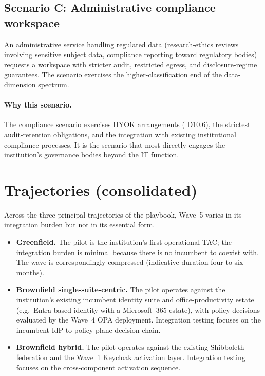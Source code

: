 \subsection{Scenario C: Administrative compliance workspace}
\label{sec:w5-scenario-compliance}

An administrative service handling regulated data (research-ethics
reviews involving sensitive subject data, compliance reporting
toward regulatory bodies) requests a workspace with stricter
audit, restricted egress, and disclosure-regime guarantees. The
scenario exercises the higher-classification end of the
data-dimension spectrum.

\paragraph{Why this scenario.} The compliance scenario exercises
HYOK arrangements ( D10.6), the strictest
audit-retention obligations, and the integration with existing
institutional compliance processes. It is the scenario that most
directly engages the institution's governance bodies beyond the IT
function.

\section{Trajectories (consolidated)}
\label{sec:w5-trajectories}

Across the three principal trajectories of the playbook, Wave~5
varies in its integration burden but not in its essential form.

\begin{itemize}[leftmargin=1.5em,nosep]
  \item \textbf{Greenfield.} The pilot is the institution's first
    operational TAC; the integration burden is minimal because
    there is no incumbent to coexist with. The wave is
    correspondingly compressed (indicative duration four to six
    months).
  \item \textbf{Brownfield single-suite-centric.} The pilot operates
    against the institution's existing incumbent identity suite and
    office-productivity estate (e.g.\ Entra-based identity with a
    Microsoft~365 estate), with policy decisions evaluated by the
    Wave~4 OPA deployment. Integration testing focuses on the
    incumbent-IdP-to-policy-plane decision chain.
  \item \textbf{Brownfield hybrid.} The pilot operates against
    the existing Shibboleth federation and the Wave~1 Keycloak
    activation layer. Integration testing focuses on the
    cross-component activation sequence.
\end{itemize}


